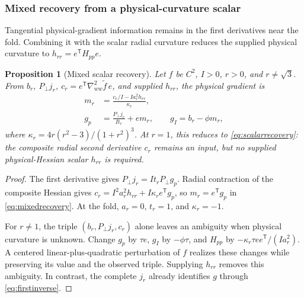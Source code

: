 \documentclass[pdflatex,sn-mathphys-num]{sn-jnl}
\newtheorem{proposition}[theorem]{Proposition}
\begin{document}
\subsubsection{Mixed recovery from a physical-curvature scalar}
Tangential physical-gradient information remains in the first derivatives near the fold. Combining it with the scalar radial curvature reduces the supplied physical curvature to $h_{rr}=e^{\mathsf T}H_{pp}e$.
\begin{proposition}[Mixed scalar recovery]
\label{prop:mixed}
Let $f$ be $C^2$, $I>0$, $r>0$, and $r\ne\sqrt3$. From $b_r$, $P_\perp j_r$, $c_r=e^{\mathsf T}\nabla^2_{ww}\widetilde f\,e$, and supplied $h_{rr}$, the physical gradient is
\begin{equation}
 \begin{aligned}
 m_r&=\frac{c_r/I-Ia_r^2h_{rr}}{\kappa_r},\\
 g_p&=\frac{P_\perp j_r}{It_r}+e m_r,\qquad
 g_I=b_r-\phi m_r,
 \end{aligned}
 \label{eq:mixedrecovery}
\end{equation}
where $\kappa_r=4r(r^2-3)/(1+r^2)^3$. At $r=1$, this reduces to \eqref{eq:scalarrecovery}: the composite radial second derivative $c_r$ remains an input, but no supplied physical-Hessian scalar $h_{rr}$ is required.
\end{proposition}
\begin{proof}
The first derivative gives $P_\perp j_r=It_rP_\perp g_p$. Radial contraction of the composite Hessian gives $c_r=I^2a_r^2h_{rr}+I\kappa_r e^{\mathsf T}g_p$, so $m_r=e^{\mathsf T}g_p$ in \eqref{eq:mixedrecovery}. At the fold, $a_r=0$, $t_r=1$, and $\kappa_r=-1$.

For $r\ne1$, the triple $(b_r,P_\perp j_r,c_r)$ alone leaves an ambiguity when physical curvature is unknown. Change $g_p$ by $\tau e$, $g_I$ by $-\phi\tau$, and $H_{pp}$ by $-\kappa_r\tau ee^{\mathsf T}/(Ia_r^2)$. A centered linear-plus-quadratic perturbation of $f$ realizes these changes while preserving its value and the observed triple. Supplying $h_{rr}$ removes this ambiguity. In contrast, the complete $j_r$ already identifies $g$ through \eqref{eq:firstinverse}.
\end{proof}
\end{document}

